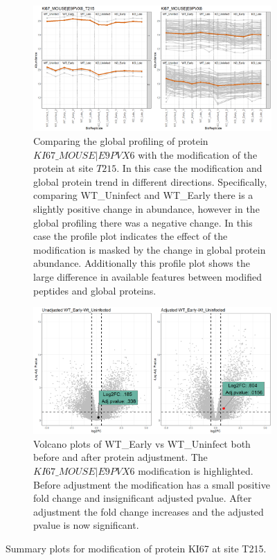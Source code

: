 \documentclass{mcp}
\begin{document}
\begin{figure}[h!]
\centering
 \begin{subfigure}{\textwidth}
 \centering
	\includegraphics[width=.9\textwidth]{sim_new/Difference_Shigella_Profile_Plot}
	\caption{Comparing the global profiling of protein $KI67\_MOUSE|E9PVX6$ with the modification of the protein at site $T215$. In this case the modification and global protein trend in different directions. Specifically, comparing WT\_Uninfect and WT\_Early there is a slightly positive change in abundance, however in the global profiling there was a negative change. In this case the profile plot indicates the effect of the modification is masked by the change in global protein abundance. Additionally this profile plot shows the large difference in available features between modified peptides and global proteins.}
 \end{subfigure}
 \begin{subfigure}{\textwidth}
 \centering
	\includegraphics[width=.9\textwidth]{sim_new/Difference_Shigella_Volcano}
	\caption{Volcano plots of WT\_Early vs WT\_Uninfect both before and after protein adjustment. The $KI67\_MOUSE|E9PVX6$ modification is highlighted. Before adjustment the modification has a small positive fold change and insignificant adjusted pvalue. After adjustment the fold change increases and the adjusted pvalue is now significant.}
 \end{subfigure}
 \caption{Summary plots for modification of protein KI67 at site T215.}
\label{fig:Diff_Shigella_PTM}
\end{figure}
\end{document}
